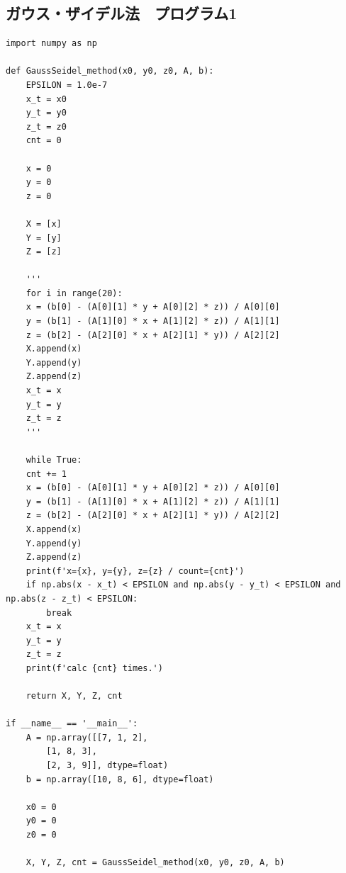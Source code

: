 \documentclass[a4paper, titlepage]{jsarticle}
\begin{document}
		\subsection{ガウス・ザイデル法　プログラム1}
			\begin{lstlisting}
import numpy as np

def GaussSeidel_method(x0, y0, z0, A, b):
    EPSILON = 1.0e-7
    x_t = x0
    y_t = y0
    z_t = z0
    cnt = 0
    
    x = 0
    y = 0
    z = 0
    
    X = [x]
    Y = [y]
    Z = [z]

    '''
    for i in range(20):
	x = (b[0] - (A[0][1] * y + A[0][2] * z)) / A[0][0]
	y = (b[1] - (A[1][0] * x + A[1][2] * z)) / A[1][1]
	z = (b[2] - (A[2][0] * x + A[2][1] * y)) / A[2][2]
	X.append(x)
	Y.append(y)
	Z.append(z)
	x_t = x
	y_t = y
	z_t = z
    '''

    while True:
	cnt += 1
	x = (b[0] - (A[0][1] * y + A[0][2] * z)) / A[0][0]
	y = (b[1] - (A[1][0] * x + A[1][2] * z)) / A[1][1]
	z = (b[2] - (A[2][0] * x + A[2][1] * y)) / A[2][2]
	X.append(x)
	Y.append(y)
	Z.append(z)
	print(f'x={x}, y={y}, z={z} / count={cnt}')
	if np.abs(x - x_t) < EPSILON and np.abs(y - y_t) < EPSILON and np.abs(z - z_t) < EPSILON:
	    break
	x_t = x
	y_t = y
	z_t = z
    print(f'calc {cnt} times.')

    return X, Y, Z, cnt

if __name__ == '__main__':
    A = np.array([[7, 1, 2],
		[1, 8, 3],
		[2, 3, 9]], dtype=float)
    b = np.array([10, 8, 6], dtype=float)

    x0 = 0
    y0 = 0
    z0 = 0

    X, Y, Z, cnt = GaussSeidel_method(x0, y0, z0, A, b)
			\end{lstlisting}
\end{document}
